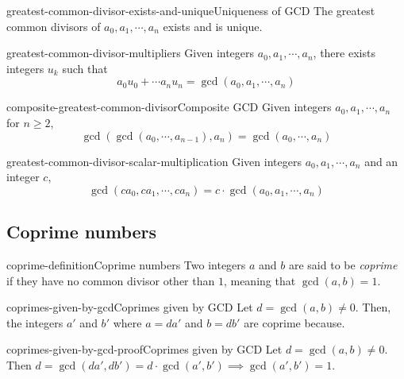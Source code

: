 \documentclass[preview]{standalone}
\begin{document}
\begin{snippetproposition}{greatest-common-divisor-exists-and-unique}{Uniqueness of GCD}
    The greatest common divisors of \(a_0, a_1, \cdots, a_n\) exists and is unique.
\end{snippetproposition}

\begin{snippetproposition}{greatest-common-divisor-multipliers}{}
Given integers \(a_0, a_1, \cdots, a_n\), there exists integers \(u_k\) such that
\[
    a_0u_0 + \cdots a_n u_n = \gcd(a_0, a_1, \cdots, a_n)
\]
\end{snippetproposition}

\begin{snippetproposition}{composite-greatest-common-divisor}{Composite GCD}
Given integers \(a_0, a_1, \cdots, a_n\)
for \(n \geq 2\), \[\gcd(\gcd(a_0, \cdots, a_{n-1}), a_n) = \gcd(a_0, \cdots, a_n)\]
\end{snippetproposition}

\begin{snippetproposition}{greatest-common-divisor-scalar-multiplication}{}
    Given integers \(a_0, a_1, \cdots, a_n\) and  an integer \(c\),
    \[\gcd(ca_0, ca_1, \cdots, ca_n) = c \cdot \gcd(a_0, a_1, \cdots, a_n)\]
\end{snippetproposition}


\subsection{Coprime numbers}

\begin{snippetdefinition}{coprime-definition}{Coprime numbers}
    Two integers \(a\) and \(b\) are said to be \textit{coprime}
    if they have no common divisor other than \(1\), meaning that \(\gcd(a,b)=1\).
\end{snippetdefinition}

\begin{snippetproposition}{coprimes-given-by-gcd}{Coprimes given by GCD}
    Let \(d = \gcd(a, b) \neq 0\). Then, the integers \(a'\) and \(b'\) where \(a = da'\) and \(b = db'\)
    are coprime because.
\end{snippetproposition}

\begin{snippetproof}{coprimes-given-by-gcd-proof}{Coprimes given by GCD}
    Let \(d = \gcd(a, b) \neq 0\). Then \(d = \gcd(da', db') = d\cdot \gcd(a', b') \implies \gcd(a', b') = 1\).
\end{snippetproof}

\end{document}
